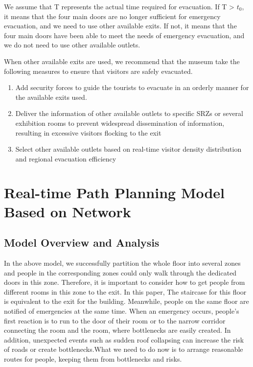 We assume that T represents the actual time required for evacuation.
If T > $t_0$, it means that the four main doors are no longer sufficient for emergency evacuation, and we need to use other available exits. If not, it means that the four main doors have been able to meet the needs of emergency evacuation, and we do not need to use other available outlets.


When other available exits are used, we recommend that the museum take the following measures to ensure that visitors are safely evacuated.

\begin{enumerate}
    \item Add security forces to guide the tourists to evacuate in an orderly manner for the available exits used.
    \item Deliver the information of other available outlets to specific SRZs or several exhibition rooms to prevent widespread dissemination of information, resulting in excessive visitors flocking to the exit
    \item Select other available outlets based on real-time visitor density distribution and regional evacuation efficiency
\end{enumerate}




\section{Real-time Path Planning Model Based on Network}

\subsection{Model Overview and Analysis}

In the above model, we successfully partition the whole floor into several zones and people in the corresponding zones could only walk through the dedicated doors in this zone. Therefore, it is important to consider how to get people from different rooms in this zone to the exit. In this paper, The staircase for this floor is equivalent to the exit for the building. Meanwhile, people on the same floor are notified of emergencies at the same time. When an emergency occurs, people's first reaction is to run to the door of their room or to the narrow corridor connecting the room and the room, where bottlenecks are easily created. In addition, unexpected events such as sudden roof collapsing can increase the risk of roads or create bottlenecks.What we need to do now is to arrange reasonable routes for people, keeping them from bottlenecks and risks.

